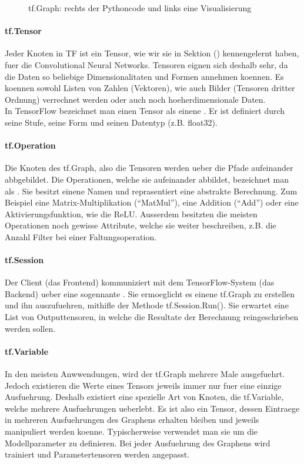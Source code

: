 \begin{figure}[h!]

  \caption{tf.Graph: rechts der Pythoncode und links eine Visualisierung}
\end{figure}

\paragraph{tf.Tensor}
Jeder Knoten in TF ist ein Tensor, wie wir sie in Sektion () kennengelernt
haben, fuer die Convolutional Neural Networks. Tensoren eignen sich deshalb
sehr, da die Daten so beliebige Dimensionalitaten und Formen annehmen koennen.
Es koennen sowohl Listen von Zahlen (Vektoren), wie auch Bilder (Tensoren
dritter Ordnung) verrechnet werden oder auch noch hoeherdimensionale Daten. \\
In TensorFlow bezeichnet man einen Tensor als einene . Er
ist definiert durch seine Stufe, seine Form und seinen Datentyp (z.B. float32).

\paragraph{tf.Operation}
Die Knoten des tf.Graph, also die Tensoren werden ueber die Pfade aufeinander
abbgebildet. Die Operationen, welche sie aufeinander abbildet, bezeichnet man
als . Sie besitzt einene Namen und reprasentiert eine
abstrakte Berechnung. Zum Beispiel eine Matrix-Multiplikation (``MatMul''),
eine Addition (``Add'') oder eine Aktivierungsfunktion, wie die ReLU. Ausserdem
besitzten die meisten Operationen noch gewisse Attribute, welche sie weiter
beschreiben, z.B. die Anzahl Filter bei einer Faltungsoperation.

\paragraph{tf.Session}
Der Client (das Frontend) kommuniziert mit dem TensorFlow-System (das Backend)
ueber eine sogennante . Sie ermoeglicht es einene tf.Graph
zu erstellen und ihn auszufuehren, mithifle der Methode tf.Session.Run(). Sie
erwartet eine List von Outputtensoren, in welche die Resultate der Berechnung
reingeschrieben werden sollen.

\paragraph{tf.Variable}
In den meisten Anwwendungen, wird der tf.Graph mehrere Male ausgefuehrt. Jedoch
existieren die Werte eines Tensors jeweils immer nur fuer eine einzige
Ausfuehrung. Deshalb existiert eine spezielle Art von Knoten, die tf.Variable,
welche mehrere Ausfuehrungen ueberlebt. Es ist also ein Tensor, dessen Eintraege
in mehreren Ausfuehrungen des Graphens erhalten bleiben und jeweils manipuliert
werden koenne. Typischerweise verwendet man sie um die Modellparameter zu
definieren. Bei jeder Ausfuehrung des Graphens wird trainiert und
Parametertensoren werden angepasst.

